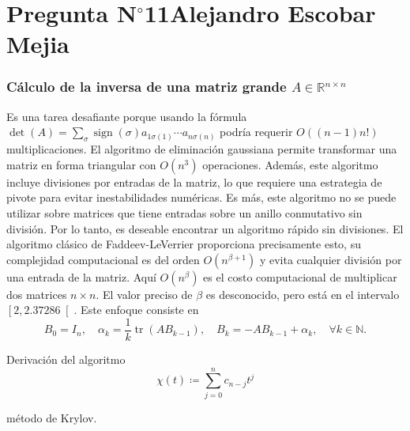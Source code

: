 \section{Pregunta N$^{\circ}$11\qquad Alejandro Escobar Mejia}

\begin{frame}
	\frametitle{
		Cálculo de la inversa de una matriz grande
		$A\in\mathbb{R}^{n\times n}$
	}

	Es una tarea desafiante porque usando la fórmula
	\begin{math}
		\det\left(A\right)=
		\sum_{\sigma}
		\operatorname{sign}\left(\sigma\right)
		a_{1\sigma\left(1\right)}
		\cdots
		a_{n\sigma\left(n\right)}
	\end{math}
	podría requerir $O\left(\left(n-1\right)n!\right)$
	multiplicaciones.
	El algoritmo de eliminación gaussiana permite transformar una
	matriz en forma triangular con $O\left(n^{3}\right)$ operaciones.
	Además, este algoritmo incluye divisiones por entradas de la
	matriz, lo que requiere una estrategia de pivote para evitar
	inestabilidades numéricas.
	Es más, este algoritmo no se puede utilizar sobre matrices que
	tiene entradas sobre un anillo conmutativo sin división.
	Por lo tanto, es deseable encontrar un algoritmo rápido sin
	divisiones.
	El algoritmo clásico de \alert{Faddeev-LeVerrier} proporciona
	precisamente esto, su complejidad computacional es del orden
	$O\left(n^{\beta+1}\right)$ y evita cualquier división por una
	entrada de la matriz.
	Aquí $O\left(n^{\beta}\right)$ es el costo computacional de
	multiplicar dos matrices $n\times n$.
	El valor preciso de $\beta$ es desconocido, pero está en el
	intervalo $\left[2,2.37286\right[$. Este enfoque consiste en
	\begin{equation*}
		B_{0}=I_{n},\quad
		\alpha_{k}=
		\dfrac{1}{k}
		\operatorname{tr}\left(AB_{k-1}\right),\quad
		B_{k}=-AB_{k-1}+\alpha_{k},\quad
		\forall k\in\mathbb{N}.
	\end{equation*}

	\begin{block}{Derivación del algoritmo}
		\begin{equation*}
			\chi\left(t\right)\coloneqq
			\sum\limits_{j=0}^{n}
			c_{n-j}t^{j}
		\end{equation*}
	\end{block}

	\alert{método de Krylov}.
\end{frame}

